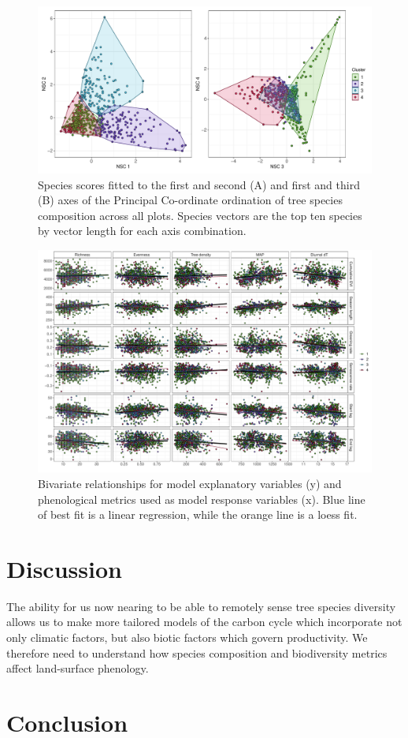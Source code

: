 \documentclass[11pt,a4paper]{article}
\begin{document}
\begin{figure}[H]
\centering
	\includegraphics[width=\textwidth]{nsca.pdf}
	\caption{Species scores fitted to the first and second (A) and first and third (B) axes of the Principal Co-ordinate ordination of tree species composition across all plots. Species vectors are the top ten species by vector length for each axis combination.}
	\label{nsca}
\end{figure}

\begin{landscape}
\begin{figure}
\centering
	\includegraphics[width=1.4\textwidth]{bivar}
	\caption{Bivariate relationships for model explanatory variables (y) and phenological metrics used as model response variables (x). Blue line of best fit is a linear regression, while the orange line is a loess fit.}
	\label{bivar}
\end{figure}
\end{landscape}

\section{Discussion}

The ability for us now nearing to be able to remotely sense tree species diversity allows us to make more tailored models of the carbon cycle which incorporate not only climatic factors, but also biotic factors which govern productivity. We therefore need to understand how species composition and biodiversity metrics affect land-surface phenology. 

\section{Conclusion}


\end{document}

